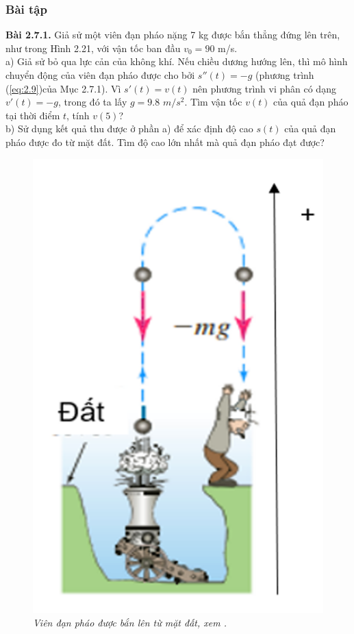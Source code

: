 \subsubsection{Bài tập}
\noindent\textbf{Bài 2.7.1. }  Giả sử một viên đạn pháo nặng 7 kg được bắn thẳng đứng lên trên, như trong Hình 2.21, với vận tốc ban đầu $v_0=90$ m/s. \\
a) Giả sử bỏ qua lực cản của không khí. Nếu chiều dương hướng lên, thì mô hình chuyển động của viên đạn pháo được cho bởi ${s}''(t)=-g$  (phương trình (\ref{eq:2.9})của Mục 2.7.1). Vì ${s}'(t)=v(t)$ nên phương trình vi phân có dạng $v'(t)=-g$, trong đó ta lấy $g=9.8$ $m/s^2$. Tìm vận tốc $v(t)$ của quả đạn pháo tại thời điểm $t$, tính $v(5)$?\\
b) Sử dụng kết quả thu được ở phần a) để xác định độ cao $s(t)$ của quả đạn pháo được đo từ mặt đất. Tìm độ cao lớn nhất mà quả đạn pháo đạt được?\\
\begin{figure}[H]
	\centering
	\includegraphics[scale=0.6]{Images/hinh_2_21.png}
	\caption[Viên đạn pháo được bắn lên từ mặt đất, xem \cite{ref4}.
	]{\itshape\fontsize{13pt}{0pt}\selectfont\centering Viên đạn pháo được bắn lên từ mặt đất, xem \cite{ref4}.}
	\label{hinh2.21}
\end{figure} 
